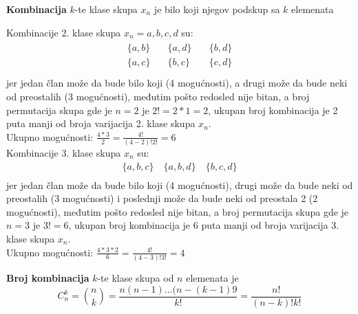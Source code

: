\begin{definition}
	\textbf{Kombinacija} $k$-te klase skupa $x_n$ je bilo koji njegov podskup sa $k$ elemenata
\end{definition}
\begin{example}
	Kombinacije 2. klase skupa $x_n = {a,b,c,d}$ su:
	\begin{align*}
		\begin{aligned}
			\{a,b\}\\
			\{a,c\}\\
		\end{aligned}
		\quad 
		\begin{aligned}
			\{a,d\}\\
			\{b,c\}\\
		\end{aligned}
		\quad 
		\begin{aligned}
			\{b,d\}\\
			\{c,d\}\\
		\end{aligned}
	\end{align*}
	jer jedan član može da bude bilo koji (4 mogućnosti), a drugi može da bude neki od preostalih (3 mogućnosti), međutim pošto redosled nije bitan, a broj permutacija skupa gde je $n=2$  je $2! = 2*1 = 2$, ukupan broj kombinacija je 2 puta manji od broja varijacija 2. klase skupa $x_n$.\\
	Ukupno mogućnosti: $\frac{4*3}{2}=\frac{4!}{(4-2)!2!}=6$  \\
	Kombinacije 3. klase skupa $x_n$ su:
	\begin{align*}
		\{a,b,c\}\quad\{a,b,d\}\quad\{b,c,d\}\\
	\end{align*}
	jer jedan član može da bude bilo koji (4 mogućnosti), drugi može da bude neki od preostalih (3 mogućnosti) i poslednji može da bude neki od preostala 2 (2 mogućnosti), međutim pošto redosled nije bitan, a broj permutacija skupa gde je $n=3$ je $3! =6$, ukupan broj kombinacija je 6 puta manji od broja varijacija 3. klase skupa $x_n$.\\
	Ukupno mogućnosti: $\frac{4*3*2}{6}=\frac{4!}{(4-3)!3!}=4$
\end{example}
\begin{theorem}
	\textbf{Broj kombinacija} $k$-te klase skupa od $n$ elemenata je $$C_n^k=\binom nk = \frac{n(n-1)\ldots(n-(k-1)9}{k!} = \frac{n!}{(n-k)!k!}$$
\end{theorem}

